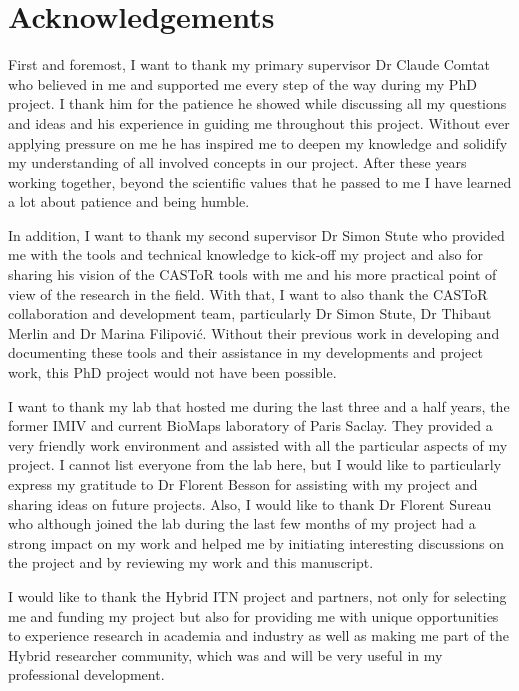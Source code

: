 \chapter*{Acknowledgements}

First and foremost, I want to thank my primary supervisor Dr Claude Comtat who believed in me and supported me every step of the way during my PhD project. I thank him for the patience he showed while discussing all my questions and ideas and his experience in guiding me throughout this project. Without ever applying pressure on me he has inspired me to deepen my knowledge and solidify my understanding of all involved concepts in our project.
 After these years working together, beyond the scientific values that he passed to me I have learned a lot about patience and being humble.

In addition, I want to thank my second supervisor Dr Simon Stute who provided me with the tools and technical knowledge to kick-off my project and also for sharing his vision of the CASToR tools with me and his more practical point of view of the research in the field.
With that, I want to also thank the CASToR collaboration and development team, particularly Dr Simon Stute, Dr Thibaut Merlin and Dr Marina Filipović. Without their previous work in developing and documenting these tools and their assistance in my developments and project work, this PhD project would not have been possible.

I want to thank my lab that hosted me during the last three and a half years, the former IMIV and current BioMaps laboratory of Paris Saclay. They provided a very friendly work environment and assisted with all the particular aspects of my project. I cannot list everyone from the lab here, but I would like to particularly express my gratitude to Dr Florent Besson for assisting with my project and sharing ideas on future projects. Also, I would like to thank Dr Florent Sureau who although joined the lab during the last few months of my project had a strong impact on my work and helped me by initiating interesting discussions on the project and by reviewing my work and this manuscript.

I would like to thank the Hybrid ITN project and partners, not only for selecting me and funding my project but also for providing me with unique opportunities to experience research in academia and industry as well as making me part of the Hybrid researcher community, which was and will be very useful in my professional development.

